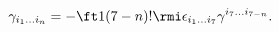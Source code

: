 \begin{equation}
\gamma_{i_1 \dots i_n}=-\ft1{(7-n)!} \rmi \epsilon_{i_1 \dots i_7}
             \gamma^{i_7 \dots i_{7-n}}.
\end{equation}

